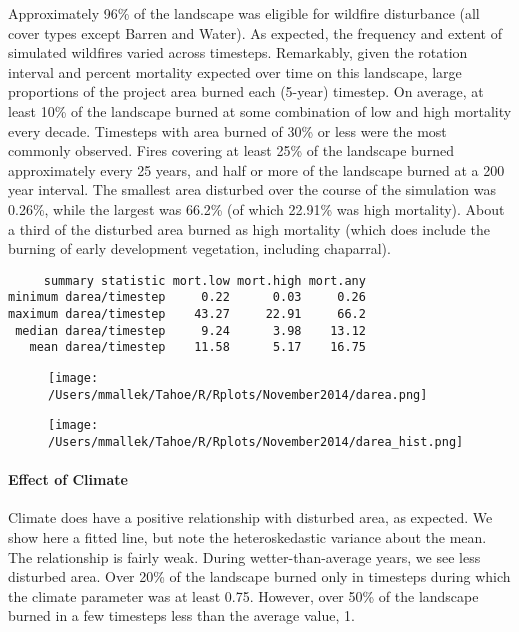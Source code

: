 Approximately 96\% of the landscape was eligible for wildfire disturbance (all cover types except Barren and Water). As expected, the frequency and extent of simulated wildfires varied across timesteps. Remarkably, given the rotation interval and percent mortality expected over time on this landscape, large proportions of the project area burned each (5-year) timestep. On average, at least 10\% of the landscape burned at some combination of low and high mortality every decade. Timesteps with area burned of 30\% or less were the most commonly observed. Fires covering at least 25\% of the landscape burned approximately every 25 years, and half or more of the landscape burned at a 200 year interval. The smallest area disturbed over the course of the simulation was 0.26\%, while the largest was 66.2\% (of which 22.91\% was high mortality). About a third of the disturbed area burned as high mortality (which does include the burning of early development vegetation, including chaparral).

\begin{verbatim}
     summary statistic mort.low mort.high mort.any
minimum darea/timestep     0.22      0.03     0.26
maximum darea/timestep    43.27     22.91     66.2
 median darea/timestep     9.24      3.98    13.12
   mean darea/timestep    11.58      5.17    16.75
\end{verbatim}

\begin{figure}
\centering
\texttt{[image: /Users/mmallek/Tahoe/R/Rplots/November2014/darea.png]}
\caption{}
\label{darea}
\end{figure}

\begin{figure}
\centering
\texttt{[image: /Users/mmallek/Tahoe/R/Rplots/November2014/darea\_hist.png]}
\caption{}
\label{darea_hist}
\end{figure}

\paragraph{Effect of Climate} Climate does have a positive relationship with disturbed area, as expected. We show here a fitted line, but note the heteroskedastic variance about the mean. The relationship is fairly weak. During wetter-than-average years, we see less disturbed area. Over 20\% of the landscape burned only in timesteps during which the climate parameter was at least 0.75. However, over 50\% of the landscape burned in a few timesteps less than the average value, 1.

